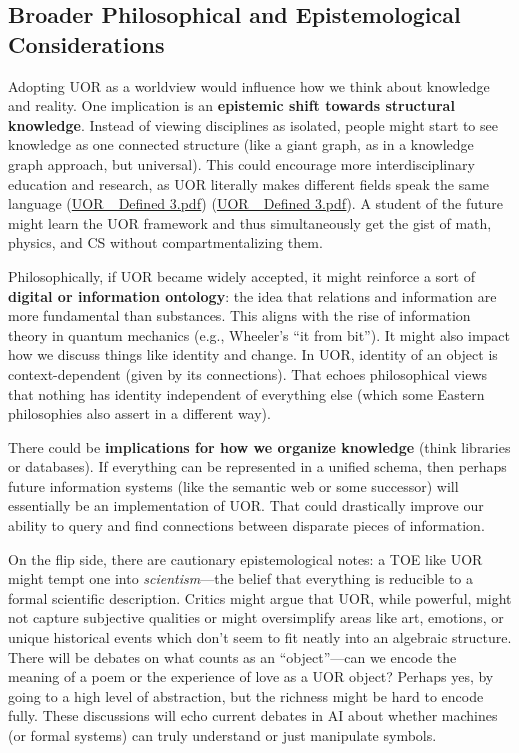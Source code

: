 \documentclass[12pt]{article}
\begin{document}
\subsection{Broader Philosophical and Epistemological Considerations}

Adopting UOR as a worldview would influence how we think about knowledge and reality. One implication is an \textbf{epistemic shift towards structural knowledge}. Instead of viewing disciplines as isolated, people might start to see knowledge as one connected structure (like a giant graph, as in a knowledge graph approach, but universal). This could encourage more interdisciplinary education and research, as UOR literally makes different fields speak the same language (\href{file://file-3oEyMHjK5WgHWfYmLyzhts#:~:text=objects%29,could%20literally%20be%20%E2%80%9Con%20the}{UOR\_ Defined 3.pdf}) (\href{file://file-3oEyMHjK5WgHWfYmLyzhts#:~:text=is%20a%20frontier,Consider%20an}{UOR\_ Defined 3.pdf}). A student of the future might learn the UOR framework and thus simultaneously get the gist of math, physics, and CS without compartmentalizing them.

\medskip

Philosophically, if UOR became widely accepted, it might reinforce a sort of \textbf{digital or information ontology}: the idea that relations and information are more fundamental than substances. This aligns with the rise of information theory in quantum mechanics (e.g., Wheeler’s ``it from bit''). It might also impact how we discuss things like identity and change. In UOR, identity of an object is context-dependent (given by its connections). That echoes philosophical views that nothing has identity independent of everything else (which some Eastern philosophies also assert in a different way).

\medskip

There could be \textbf{implications for how we organize knowledge} (think libraries or databases). If everything can be represented in a unified schema, then perhaps future information systems (like the semantic web or some successor) will essentially be an implementation of UOR. That could drastically improve our ability to query and find connections between disparate pieces of information.

\medskip

On the flip side, there are cautionary epistemological notes: a TOE like UOR might tempt one into \emph{scientism}---the belief that everything is reducible to a formal scientific description. Critics might argue that UOR, while powerful, might not capture subjective qualities or might oversimplify areas like art, emotions, or unique historical events which don’t seem to fit neatly into an algebraic structure. There will be debates on what counts as an ``object''---can we encode the meaning of a poem or the experience of love as a UOR object? Perhaps yes, by going to a high level of abstraction, but the richness might be hard to encode fully. These discussions will echo current debates in AI about whether machines (or formal systems) can truly understand or just manipulate symbols.
\end{document}
